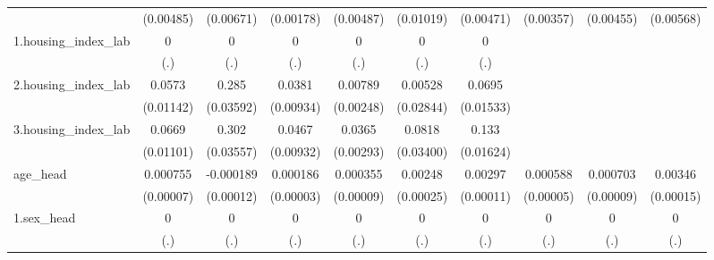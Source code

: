 \begin{table}[htbp]
\begin{tabular}{l*{9}{c}}
            &   (0.00485)         &   (0.00671)         &   (0.00178)         &   (0.00487)         &   (0.01019)         &   (0.00471)         &   (0.00357)         &   (0.00455)         &   (0.00568)         \\
1.housing\_index\_lab&           0         &           0         &           0         &           0         &           0         &           0         &                     &                     &                     \\
            &         (.)         &         (.)         &         (.)         &         (.)         &         (.)         &         (.)         &                     &                     &                     \\
2.housing\_index\_lab&      0.0573\sym{***}&       0.285\sym{***}&      0.0381\sym{***}&     0.00789\sym{***}&     0.00528         &      0.0695\sym{***}&                     &                     &                     \\
            &   (0.01142)         &   (0.03592)         &   (0.00934)         &   (0.00248)         &   (0.02844)         &   (0.01533)         &                     &                     &                     \\
3.housing\_index\_lab&      0.0669\sym{***}&       0.302\sym{***}&      0.0467\sym{***}&      0.0365\sym{***}&      0.0818\sym{**} &       0.133\sym{***}&                     &                     &                     \\
            &   (0.01101)         &   (0.03557)         &   (0.00932)         &   (0.00293)         &   (0.03400)         &   (0.01624)         &                     &                     &                     \\
age\_head    &    0.000755\sym{***}&   -0.000189         &    0.000186\sym{***}&    0.000355\sym{***}&     0.00248\sym{***}&     0.00297\sym{***}&    0.000588\sym{***}&    0.000703\sym{***}&     0.00346\sym{***}\\
            &   (0.00007)         &   (0.00012)         &   (0.00003)         &   (0.00009)         &   (0.00025)         &   (0.00011)         &   (0.00005)         &   (0.00009)         &   (0.00015)         \\
1.sex\_head  &           0         &           0         &           0         &           0         &           0         &           0         &           0         &           0         &           0         \\
            &         (.)         &         (.)         &         (.)         &         (.)         &         (.)         &         (.)         &         (.)         &         (.)         &         (.)         \\

\end{tabular}
\end{table}
